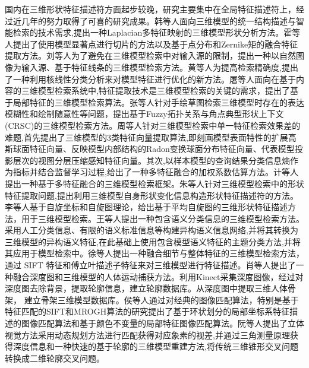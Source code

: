 \documentclass[twoside,UTF8]{nputhesis}
\begin{document}
国内在三维形状特征描述符方面起步较晚，研究主要集中在全局特征描述符上，经过近几年的努力取得了可喜的研究成果。韩等人\cite{韩丽2015Laplacian}面向三维模型的统一结构描述与智能检索的技术需求,提出一种Laplacian多特征映射的三维模型形状分析方法。霍等人\cite{霍磊2015基于显著点切片的三维模型检索}提出了使用模型显著点进行切片的方法以及基于点分布和Zernike矩的融合特征提取方法。刘等人\cite{刘志2016基于特征线条的三维模型检索方法}为了避免在三维模型检索中对输入源的限制，提出一种以自然图像为输入源、基于特征线条的三维模型检索方法。黄等人\cite{黄骥2016基于核线性分类分析的三维模型检索算法}为提高检索精确度,提出了一种利用核线性分类分析来对模型特征进行优化的新方法。屠等人\cite{屠宏2015一种基于局部特征的三维模型检索算法}面向在基于内容的三维模型检索系统中,特征提取技术是三维模型检索的关键的需求，提出了基于局部特征的三维模型检索算法。张等人\cite{张全贵2017融合}针对手绘草图检索三维模型时存在的表达模糊性和绘制随意性等问题，提出基于Fuzzy拓扑关系与角点典型形状上下文(CRSC)的三维模型检索方法。周等人\cite{周燕2016基于多特征融合的三维模型检索算法}针对三维模型检索中单一特征检索效果差的难题,首先提出了三维模型的3类特征向量提取算法,即刻画模型表面特性的扩展高斯球面特征向量、反映模型内部结构的Radon变换球面分布特征向量、代表模型投影层次的视图分层压缩感知特征向量。其次,以样本模型的查询结果分类信息熵作为指标并结合监督学习过程,给出了一种多特征融合的加权系数估算方法。计等人\cite{计明明2015基于多特征融合的三维模型检索技术}提出一种基于多特征融合的三维模型检索框架。朱等人\cite{朱新懿2015使用形状变化描述三维模型}针对三维模型检索中的形状特征提取问题,提出利用三维模型自身形状变化信息构造形状特征描述符的方法。李等人\cite{李闯2016基于平均自旋图的三维形状特征描述}基于自旋坐标和自旋图理论，给出基于平均自旋图的三维形状特征描述方法，用于三维模型检索。王等人\cite{王新颖2015基于异构特征}提出一种包含语义分类信息的三维模型检索方法。采用人工分类信息、有限的语义标准信息等构建异构语义信息网络,并将其转换为三维模型的异构语义特征,在此基础上使用包含模型语义特征的主题分类方法,并将其应用于模型检索中。徐等人\cite{徐平安2015融合细节与整体特征的三维模型检索方法}提出一种融合细节与整体特征的三维模型检索方法，通过 SIFT 特征和傅立叶描述子特征来对三维模型进行特征描述。肖\cite{肖秦琨2015融合深度图和三维模型的人体运动捕获}等人提出了一种融合深度图和三维模型的人体运动捕获方法。利用Kinect采集深度图像，经过对深度图去除背景，提取轮廓信息，建立轮廓数据库。从深度图中提取三维人体骨架， 建立骨架三维模型数据库。侯等人\cite{侯晓丽2014基于局部特征的图像匹配算法研究}通过对经典的图像匹配算法，特别是基于特征匹配的SIFT和MROGH算法的研究提出了基于环状划分的局部坐标系特征描述的图像匹配算法和基于颜色不变量的局部特征图像匹配算法。阮等人\cite{阮孟贵2010基于图像三维模型重建的研究}提出了立体视觉方法采用动态规划方法进行匹配获得对应象素的视差,并通过三角测量原理获得深度信息和一种快速的基于轮廓的三维模型重建方法,将传统三维锥形交叉问题转换成二维轮廓交叉问题。
\end{document}
